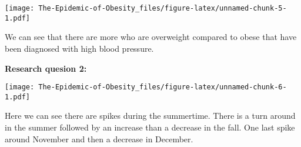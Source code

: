 \documentclass[
]{article}
\newenvironment{Shaded}{\begin{snugshade}}{\end{snugshade}}
\newcommand{\DataTypeTok}[1]{\textcolor[rgb]{0.13,0.29,0.53}{#1}}
\newcommand{\FloatTok}[1]{\textcolor[rgb]{0.00,0.00,0.81}{#1}}
\newcommand{\KeywordTok}[1]{\textcolor[rgb]{0.13,0.29,0.53}{\textbf{#1}}}
\newcommand{\NormalTok}[1]{#1}
\newcommand{\OperatorTok}[1]{\textcolor[rgb]{0.81,0.36,0.00}{\textbf{#1}}}
\newcommand{\StringTok}[1]{\textcolor[rgb]{0.31,0.60,0.02}{#1}}
\begin{document}
\begin{Shaded}
\end{Shaded}

\texttt{[image: The-Epidemic-of-Obesity\_files/figure-latex/unnamed-chunk-5-1.pdf]}

We can see that there are more who are overweight compared to obese that
have been diagnosed with high blood pressure.

\textbf{Research quesion 2:}

\begin{Shaded}
\end{Shaded}

\texttt{[image: The-Epidemic-of-Obesity\_files/figure-latex/unnamed-chunk-6-1.pdf]}

Here we can see there are spikes during the summertime. There is a turn
around in the summer followed by an increase than a decrease in the
fall. One last spike around November and then a decrease in December.
\end{document}
